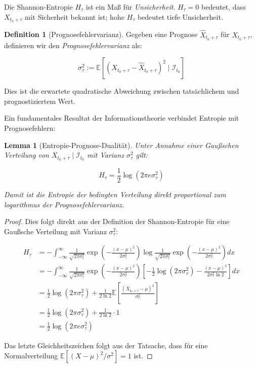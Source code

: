 \documentclass[12pt, a4paper, titlepage]{report}
\newtheorem{lemma}[theorem]{Lemma}
\theoremstyle{definition}
\newtheorem{definition}[theorem]{Definition}
\theoremstyle{remark}
\newcommand{\E}{\mathbb{E}}
\begin{document}
Die Shannon-Entropie $H_\tau$ ist ein Maß für \emph{Unsicherheit}. $H_\tau = 0$ bedeutet, dass $X_{t_0+\tau}$ mit Sicherheit bekannt ist; hohe $H_\tau$ bedeutet tiefe Unsicherheit.

\begin{definition}[Prognosefehlervarianz]
Gegeben eine Prognose $\hat{X}_{t_0+\tau}$ für $X_{t_0+\tau}$, definieren wir den \emph{Prognosefehlervarianz} als:

\begin{equation}
\sigma_\tau^2 := \E\left[ \left( X_{t_0+\tau} - \hat{X}_{t_0+\tau} \right)^2 \mid \mathcal{I}_{t_0} \right]
\label{eq:mse}
\end{equation}

Dies ist die erwartete quadratische Abweichung zwischen tatsächlichem und prognostiziertem Wert.
\end{definition}

Ein fundamentales Resultat der Informationstheorie verbindet Entropie mit Prognosefehlern:

\begin{lemma}[Entropie-Prognose-Dualität]
Unter Annahme einer Gaußschen Verteilung von $X_{t_0+\tau} \mid \mathcal{I}_{t_0}$ mit Varianz $\sigma_\tau^2$ gilt:

\begin{equation}
H_\tau = \frac{1}{2} \log(2\pi e \sigma_\tau^2)
\label{eq:entropie_varianz}
\end{equation}

Damit ist die Entropie der bedingten Verteilung direkt proportional zum logarithmus der Prognosefehlervarianz.
\end{lemma}

\begin{proof}
Dies folgt direkt aus der Definition der Shannon-Entropie für eine Gaußsche Verteilung mit Varianz $\sigma_\tau^2$:

\begin{align}
H_\tau &= -\int_{-\infty}^{\infty} \frac{1}{\sqrt{2\pi\sigma_\tau^2}} \exp\left( -\frac{(x-\mu)^2}{2\sigma_\tau^2} \right) \log \frac{1}{\sqrt{2\pi\sigma_\tau^2}} \exp\left( -\frac{(x-\mu)^2}{2\sigma_\tau^2} \right) dx \\
&= -\int_{-\infty}^{\infty} \frac{1}{\sqrt{2\pi\sigma_\tau^2}} \exp\left( -\frac{(x-\mu)^2}{2\sigma_\tau^2} \right) \left[ -\frac{1}{2}\log(2\pi\sigma_\tau^2) - \frac{(x-\mu)^2}{2\sigma_\tau^2\ln 2} \right] dx \\
&= \frac{1}{2}\log(2\pi\sigma_\tau^2) + \frac{1}{2\ln 2} \E\left[ \frac{(X_{t_0+\tau}-\mu)^2}{\sigma_\tau^2} \right] \\
&= \frac{1}{2}\log(2\pi\sigma_\tau^2) + \frac{1}{2\ln 2} \cdot 1 \\
&= \frac{1}{2} \log(2\pi e \sigma_\tau^2)
\end{align}

Das letzte Gleichheitszeichen folgt aus der Tatsache, dass für eine Normalverteilung $\E[(X-\mu)^2/\sigma^2] = 1$ ist.
\end{proof}
\end{document}
